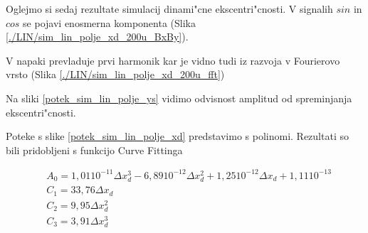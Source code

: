 Oglejmo si sedaj rezultate simulacij dinami"cne ekscentri"cnosti. V signalih $sin$ in $cos$ se pojavi enosmerna komponenta (Slika \ref{./LIN/sim_lin_polje_xd_200u_BxBy}).


V napaki prevladuje prvi harmonik kar je vidno tudi iz razvoja v Fourierovo vrsto (Slika \ref{./LIN/sim_lin_polje_xd_200u_fft})




Na sliki \ref{potek_sim_lin_polje_ys} vidimo odvisnost amplitud od spreminjanja ekscentri"cnosti.


Poteke s slike \ref{potek_sim_lin_polje_xd} predstavimo  s polinomi.  Rezultati so bili pridobljeni s funkcijo Curve Fittinga

\begin{eqnarray}
&A_0=1,01 10^{-11} \Delta x_d^3 -6,89 10^{-12} \Delta x_d^2+1,25 10^{-12} \Delta x_d+1,11 10^{-13}\\
&C_1=33,76 \Delta x_d\\
&C_2=9,95 \Delta x_d^2\\
&C_3=3,91 \Delta x_d^3
\end{eqnarray}




%
